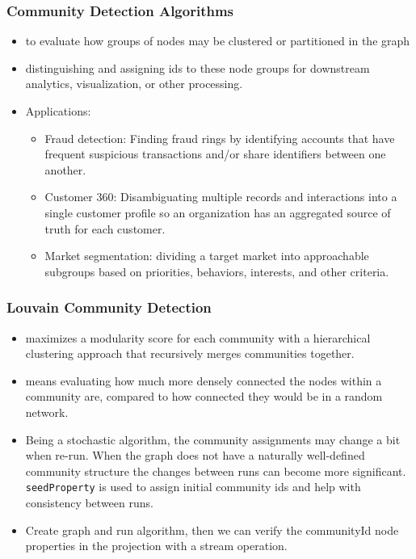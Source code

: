 \begin{frame}[fragile]\frametitle{Community Detection Algorithms}

 
 \begin{itemize}
\item to evaluate how groups of nodes may be clustered or partitioned in the graph
\item distinguishing and assigning ids to these node groups for downstream analytics, visualization, or other processing.
\item Applications:
	\begin{itemize}
	\item Fraud detection: Finding fraud rings by identifying accounts that have frequent suspicious transactions and/or share identifiers between one another.
	\item Customer 360: Disambiguating multiple records and interactions into a single customer profile so an organization has an aggregated source of truth for each customer.
	\item Market segmentation: dividing a target market into approachable subgroups based on priorities, behaviors, interests, and other criteria.
	\end{itemize}
\end{itemize}



\end{frame}

\begin{frame}[fragile]\frametitle{Louvain Community Detection}

 
 \begin{itemize}
\item maximizes a modularity score for each community with a hierarchical clustering approach that recursively merges communities together. 
\item means evaluating how much more densely connected the nodes within a community are, compared to how connected they would be in a random network.
\item Being a stochastic algorithm, the community assignments may change a bit when re-run. When the graph does not have a naturally well-defined community structure the changes between runs can become more significant. \lstinline|seedProperty| is used to  assign initial community ids and help with consistency between runs. 
\item Create graph and run algorithm, then we can verify the communityId node properties in the projection with a stream operation.
\end{itemize}


\end{frame}

